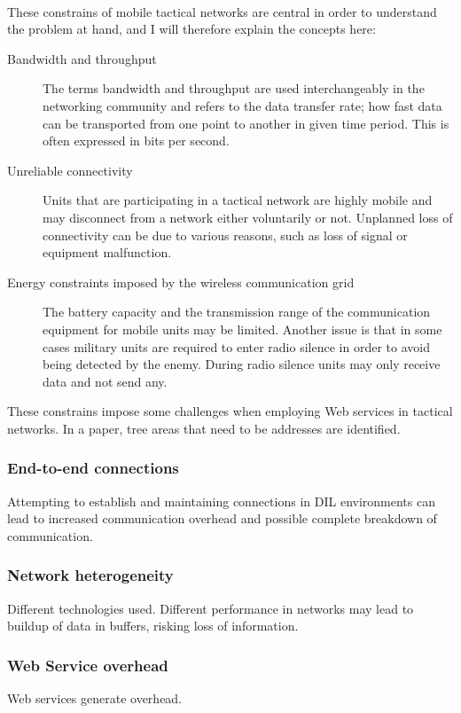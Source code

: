 \documentclass[USenglish]{ifimaster}
\begin{document}
\paragraph{}
These constrains of mobile tactical networks are central in order to understand
the problem at hand, and I will therefore explain the concepts here:
\begin{description}
\item[Bandwidth and throughput] The terms bandwidth and throughput are used
interchangeably in the networking community and refers to the data transfer
rate; how fast data can be transported from one point to another in given time
period. This is often expressed in bits per second.
\item[Unreliable connectivity] Units that are participating in a tactical
network are highly mobile and may disconnect from a network either voluntarily
or not. Unplanned loss of connectivity can be due to various reasons, such as
loss of signal or equipment malfunction.
\item[Energy constraints imposed by the wireless communication grid] The battery
capacity and the transmission range of the communication equipment for mobile
units may be limited. Another issue is that in some cases military units are
required to enter radio silence in order to avoid being detected by the enemy.
During radio silence units may only receive data and not send any.
\end{description}

These constrains impose some challenges when employing Web services in
tactical networks. In a paper, tree areas that need to be addresses are
identified\cite{IST-118}.
\label{section:DIL-problems}

\subsubsection{End-to-end connections}
Attempting to establish and maintaining connections in DIL environments can lead to increased communication overhead and possible complete breakdown of communication.
\subsubsection{Network heterogeneity}
Different technologies used. Different performance in networks may lead to buildup of data in buffers, risking loss of information.
\subsubsection{Web Service overhead}
Web services generate overhead.
\end{document}
